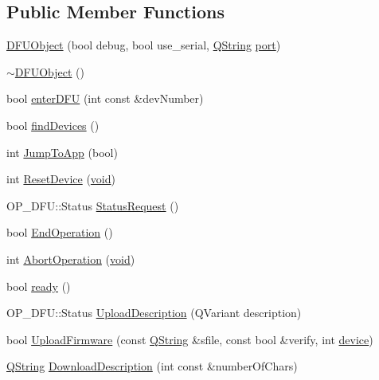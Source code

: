 \subsection*{\-Public \-Member \-Functions}
\begin{DoxyCompactItemize}
\item 
\hyperlink{group___uploader_gacb8ee3e1b1358ae25813e37f08b6d510}{\-D\-F\-U\-Object} (bool debug, bool use\-\_\-serial, \hyperlink{group___u_a_v_objects_plugin_gab9d252f49c333c94a72f97ce3105a32d}{\-Q\-String} \hyperlink{classport}{port})
\item 
\hyperlink{group___uploader_gad3eb7cce298c72c456a84eb04cc9c0fe}{$\sim$\-D\-F\-U\-Object} ()
\item 
bool \hyperlink{group___uploader_ga64ed24565b35c4530dd2614cc98f38cd}{enter\-D\-F\-U} (int const \&dev\-Number)
\item 
bool \hyperlink{group___uploader_ga09f55b9de769e32ad728223294a8a500}{find\-Devices} ()
\item 
int \hyperlink{group___uploader_gad6165621f503c5767306199a8606edaf}{\-Jump\-To\-App} (bool)
\item 
int \hyperlink{group___uploader_gafbdc3dede843764690ebd5bc074ff5dd}{\-Reset\-Device} (\hyperlink{group___u_a_v_objects_plugin_ga444cf2ff3f0ecbe028adce838d373f5c}{void})
\item 
\-O\-P\-\_\-\-D\-F\-U\-::\-Status \hyperlink{group___uploader_gadd798371bcb5c155ef215f5a77316471}{\-Status\-Request} ()
\item 
bool \hyperlink{group___uploader_ga16f60a8d921f01aca803178398ccdf45}{\-End\-Operation} ()
\item 
int \hyperlink{group___uploader_gaa448917a297dd634c2ab4d760a6c402d}{\-Abort\-Operation} (\hyperlink{group___u_a_v_objects_plugin_ga444cf2ff3f0ecbe028adce838d373f5c}{void})
\item 
bool \hyperlink{class_o_p___d_f_u_1_1_d_f_u_object_a1c9a40869c444e1c095c99b74a1d5f77}{ready} ()
\item 
\-O\-P\-\_\-\-D\-F\-U\-::\-Status \hyperlink{group___uploader_ga6513c6ff0fee1f11aebd6312296e6ed6}{\-Upload\-Description} (\-Q\-Variant description)
\item 
bool \hyperlink{group___uploader_gacccdb64a8aa1c8ff0f90296fcb935fef}{\-Upload\-Firmware} (const \hyperlink{group___u_a_v_objects_plugin_gab9d252f49c333c94a72f97ce3105a32d}{\-Q\-String} \&sfile, const bool \&verify, int \hyperlink{struct_o_p___d_f_u_1_1device}{device})
\item 
\hyperlink{group___u_a_v_objects_plugin_gab9d252f49c333c94a72f97ce3105a32d}{\-Q\-String} \hyperlink{group___uploader_ga5c3ae32c69bac4c663f6be430da1db3d}{\-Download\-Description} (int const \&number\-Of\-Chars)

\end{DoxyCompactItemize}
